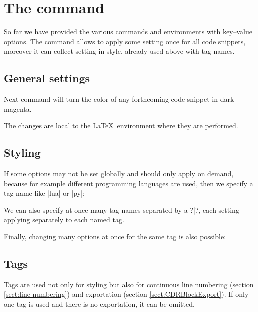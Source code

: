 \documentclass{article}
\begin{document}

\section{The  command}
So far we have provided the various  commands and environments with key--value options. The  command allows to apply some setting once for all code snippets, moreover it can collect setting in style, already used above with tag names.

\subsection{General settings}
Next command will turn the color of any forthcoming code snippet in dark magenta.
\begin{CDRBlock}[tags=src]
\end{CDRBlock}
The changes are local to the \LaTeX\ environment where they are performed.
\subsection{Styling}
\label{sect:styling}
If some options may not be set globally and should only apply on demand, because for example different programming languages are used, then we specify a tag name like \CDRCode[tags=options]|lua| or \CDRCode[tags=options]|py|:
\begin{CDRBlock}[tags=src]
\end{CDRBlock}
We can also specify at once many tag names separated by a \CDRCode[tags=src]?|?, each setting applying separately to each named tag.
\begin{CDRBlock}[tags=src]
\end{CDRBlock}
Finally, changing many options at once for the same tag is also possible:
\begin{CDRBlock}[tags=src]
\end{CDRBlock}
\subsection{Tags}
\label{sect:tags}
Tags are used not only for styling but also for continuous line numbering (section \ref{sect:line numbering}) and exportation (section \ref{sect:CDRBlockExport}). If only one tag is used and there is no exportation, it can be omitted.
\end{document}
